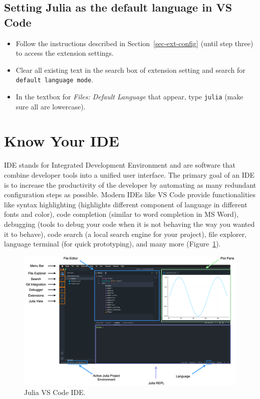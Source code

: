 \documentclass[
  letterpaper,
]{book}
\providecommand{\tightlist}{%
  \setlength{\itemsep}{0pt}\setlength{\parskip}{0pt}}\usepackage{longtable,booktabs,array}
\begin{document}
\hypertarget{sec-julia-vscode-default}{%
\subsection{Setting Julia as the default language in VS
Code}\label{sec-julia-vscode-default}}

\begin{itemize}
\tightlist
\item
  Follow the instructions described in Section~\ref{sec-ext-config}
  (until step three) to access the extension settings.
\item
  Clear all existing text in the search box of extension setting and
  search for \texttt{default\ language\ mode}.
\item
  In the textbox for \emph{Files: Default Language} that appear, type
  \texttt{julia} (make sure all are lowercase).
\end{itemize}

\hypertarget{know-your-ide}{%
\section{Know Your IDE}\label{know-your-ide}}

IDE stands for Integrated Development Environment and are software that
combine developer tools into a unified user interface. The primary goal
of an IDE is to increase the productivity of the developer by automating
as many redundant configuration steps as possible. Modern IDEs like VS
Code provide functionalities like syntax highlighting (highlights
different component of language in different fonts and color), code
completion (similar to word completion in MS Word), debugging (tools to
debug your code when it is not behaving the way you wanted it to
behave), code search (a local search engine for your project), file
explorer, language terminal (for quick prototyping), and many more
(Figure~\ref{fig-vscode-home}).

\begin{figure}

{\centering \includegraphics{./images/vscode-tour.png}

}

\caption{\label{fig-vscode-home}Julia VS Code IDE.}

\end{figure}
\end{document}
